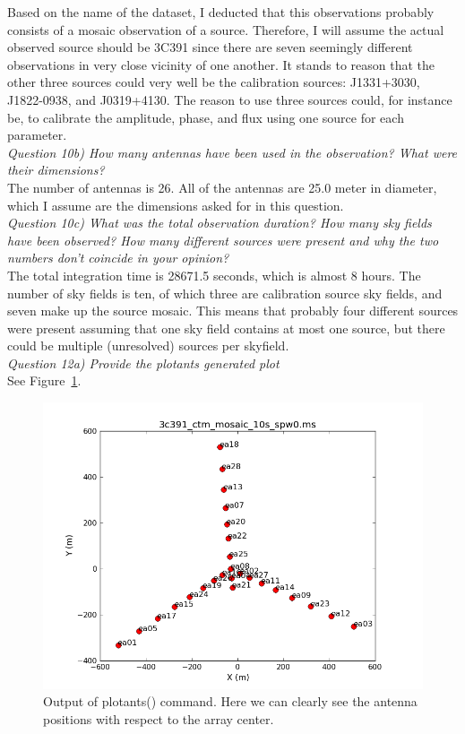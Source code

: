 \documentclass[12pt, a4paper]{article}
\begin{document}
Based on the name of the dataset, I deducted that this observations probably consists of a mosaic observation of a source. Therefore, I will assume the actual observed source should be 3C391 since there are seven seemingly different observations in very close vicinity of one another. It stands to reason that  the other three sources could very well be the calibration sources: J1331+3030, J1822-0938, and J0319+4130. The reason to use three sources could, for instance be, to calibrate the amplitude, phase, and flux using one source for each parameter. \\

\noindent \textit{Question 10b) How many antennas have been used in the observation? What were their dimensions?} \\
The number of antennas is 26. All of the antennas are 25.0 meter in diameter, which I assume are the dimensions asked for in this question. \\

\noindent \textit{Question 10c) What was the total observation duration? How many sky fields have been observed? How many different sources were present and why the two numbers don’t coincide in your opinion?} \\
The total integration time is 28671.5 seconds, which is almost 8 hours. The number of sky fields is ten, of which three are calibration source sky fields, and seven make up the source mosaic. This means that probably four different sources were present assuming that one sky field contains at most one source, but there could be multiple (unresolved) sources per skyfield. \\

\noindent \textit{Question 12a) Provide the plotants generated plot} \\
See Figure~\ref{fig:12b}. \\
\begin{figure}
    \centering
    \includegraphics[scale=0.7]{../Imaging/plots/plotants_vraag12.png}
    \caption{Output of plotants() command. Here we can clearly see the antenna positions with respect to the array center. \label{fig:12b}}
\end{figure}
\end{document}
